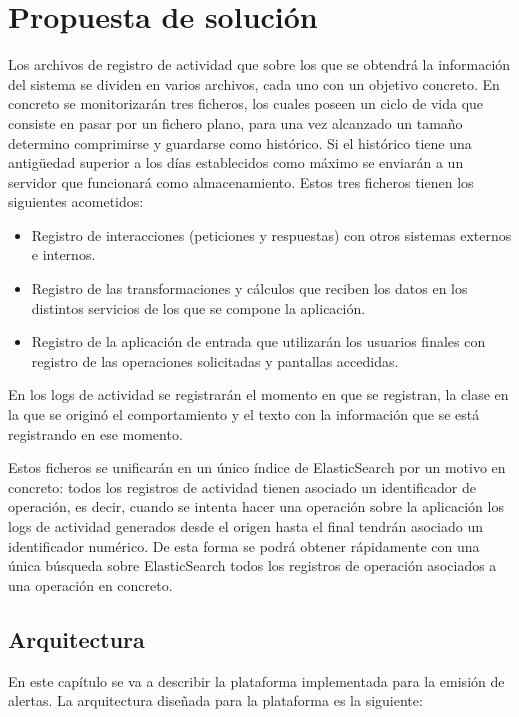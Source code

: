 \chapter{Propuesta de solución}


Los archivos de registro de actividad que sobre los que se obtendrá la información del sistema se dividen en varios archivos, cada uno con un objetivo concreto. En concreto se monitorizarán tres ficheros, los cuales poseen un ciclo de vida que consiste en pasar por un fichero plano, para una vez alcanzado un tamaño determino comprimirse y guardarse como histórico. Si el histórico tiene una antigüedad superior a los días establecidos como máximo se enviarán a un servidor que funcionará como almacenamiento. Estos tres ficheros tienen los siguientes acometidos:

\begin{itemize}
\item Registro de interacciones (peticiones y respuestas) con otros sistemas externos e internos.
\item Registro de las transformaciones y cálculos que reciben los datos en los distintos servicios de los que se compone la aplicación.
\item Registro de la aplicación de entrada que utilizarán los usuarios finales con registro de las operaciones solicitadas y pantallas accedidas.
\end{itemize}

En los logs de actividad se registrarán el momento en que se registran, la clase en la que se originó el comportamiento y el texto con la información que se está registrando en ese momento. 

Estos ficheros se unificarán en un único índice de ElasticSearch por un motivo en concreto: todos los registros de actividad tienen asociado un identificador de operación, es decir, cuando se intenta hacer una operación sobre la aplicación los logs de actividad generados desde el origen hasta el final tendrán asociado un identificador numérico. De esta forma se podrá obtener rápidamente con una única búsqueda sobre ElasticSearch todos los registros de operación asociados a una operación en concreto.

\section{Arquitectura}

En este capítulo se va a describir la plataforma implementada para la emisión de alertas. La arquitectura diseñada para la plataforma es la siguiente:

